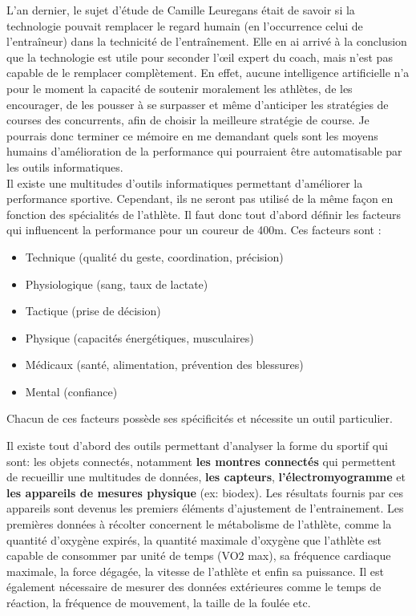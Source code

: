 L'an dernier, le sujet d'étude de Camille Leuregans était de savoir si la technologie pouvait remplacer le regard humain (en l’occurrence celui de l’entraîneur) dans la technicité de l’entraînement. Elle en ai arrivé à la conclusion que la technologie est utile pour seconder l’œil expert du coach, mais n'est pas capable de le remplacer complètement. En effet, aucune intelligence artificielle n'a pour le moment la capacité de soutenir moralement les athlètes, de les encourager, de les pousser à se surpasser et même d’anticiper les stratégies de courses des concurrents, afin de choisir la meilleure stratégie de course. 
Je pourrais donc  terminer ce mémoire en me demandant quels sont les moyens humains d'amélioration de la performance qui pourraient être automatisable par les outils informatiques.\\


Il existe une multitudes d'outils informatiques permettant d'améliorer la performance sportive. Cependant, ils ne seront pas utilisé de la même façon en fonction des spécialités de l'athlète. Il faut donc tout d'abord définir les facteurs qui influencent la performance pour un coureur de 400m.
Ces facteurs sont :
\begin{itemize}
\item Technique (qualité du geste, coordination, précision)
\item Physiologique (sang, taux de lactate)
\item Tactique (prise de décision)
\item Physique (capacités énergétiques, musculaires)
\item Médicaux (santé, alimentation, prévention des blessures)
\item Mental (confiance)\\

\end{itemize}

Chacun de ces facteurs possède ses spécificités et nécessite un outil particulier.

Il existe tout d'abord des outils permettant d'analyser la forme du sportif qui sont: les objets connectés, notamment \textbf{les montres connectés} qui permettent de recueillir une multitudes de données, \textbf{les capteurs},  \textbf{l'électromyogramme} et \textbf{les appareils de mesures physique} (ex: biodex). Les résultats fournis par ces appareils sont devenus les premiers éléments d'ajustement de l'entrainement. Les premières données à récolter concernent le métabolisme de l'athlète, comme la quantité d'oxygène expirés, la quantité maximale d’oxygène que l’athlète est capable de consommer par unité de temps (VO2 max), sa fréquence cardiaque maximale, la force dégagée, la vitesse de l'athlète et enfin sa puissance. Il est également nécessaire de mesurer des données extérieures comme le temps de réaction, la fréquence de mouvement, la taille de la foulée etc.

